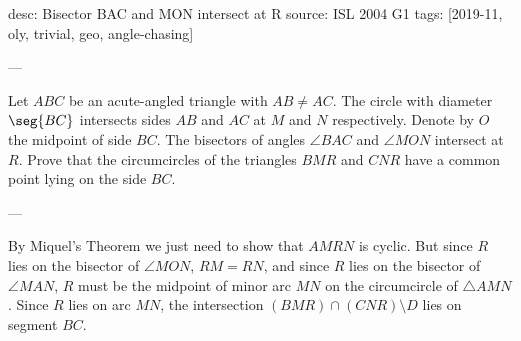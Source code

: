 desc: Bisector BAC and MON intersect at R
source: ISL 2004 G1
tags: [2019-11, oly, trivial, geo, angle-chasing]

---

Let $ABC$ be an acute-angled triangle with $AB\ne AC$. The circle with diameter $\seg{BC}$ intersects sides $AB$ and $AC$ at $M$ and $N$ respectively. Denote by $O$ the midpoint of side $BC$. The bisectors of angles $\angle BAC$ and $\angle MON$ intersect at $R$. Prove that the circumcircles of the triangles $BMR$ and $CNR$ have a common point lying on the side $BC$.

---

By Miquel's Theorem we just need to show that $AMRN$ is cyclic. But since $R$ lies on the bisector of $\angle MON$, $RM=RN$, and since $R$ lies on the bisector of $\angle MAN$, $R$ must be the midpoint of minor arc $MN$ on the circumcircle of $\triangle AMN$. Since $R$ lies on arc $MN$, the intersection $(BMR)\cap(CNR)\setminus D$ lies on segment $BC$.
